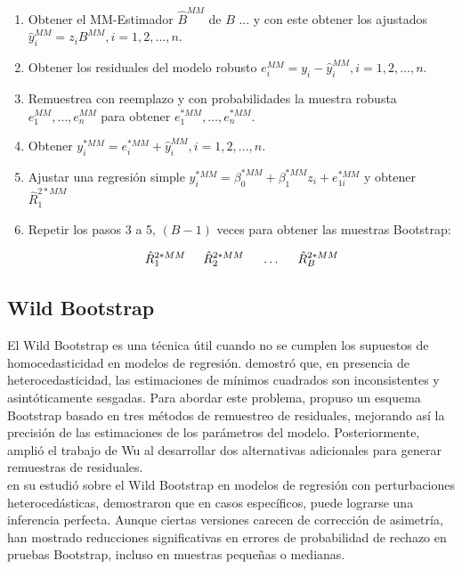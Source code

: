 \begin{enumerate}
	\item Obtener el MM-Estimador $\hat{B}^{MM}$ de $B$ ... y con este  obtener los ajustados $ \hat{y}^{MM}_{i} = z_{i}B^{MM},i=1,2,..., n$.
	
	\item Obtener los residuales del modelo robusto $ e^{MM}_{i} = y_{i}-\hat{y}^{MM}_{i},i = 1,2, \dots, n$.
	
	\item Remuestrea con reemplazo y con probabilidades la muestra robusta $ e^{MM}_{1},\dots, e^{MM}_{n}$ para obtener $ e^{*MM}_{1},\dots, e^{*MM}_{n}$.
	
	\item Obtener $y^{*MM}_{i} = e^{*MM}_{i} + \hat{y}^{MM}_{i},i=1,2,..., n  $.
	
	\item Ajustar una regresión simple $ y^{*MM}_{i} = \beta_{0}^{*MM}+\beta_{1}^{*MM}z_{i} + e^{*MM}_{1i}$ y obtener $\hat{R}^{2*MM}_{1}$
	
	\item Repetir los pasos 3 a 5, $(B-1)$ veces para obtener las muestras Bootstrap:
	
	\[
	\hat{R}^{2*MM}_{1} \hspace{.5cm} \hat{R}^{2*MM}_{2} \hspace{.5cm} \dots \hspace{.5cm} \hat{R}^{2*MM}_{B}
	\]
\end{enumerate}



\subsection{Wild Bootstrap}
El Wild Bootstrap es una técnica útil cuando no se cumplen los supuestos de homocedasticidad en modelos de regresión. \textcite{wu-1986} demostró que, en presencia de heterocedasticidad, las estimaciones de mínimos cuadrados son inconsistentes y asintóticamente sesgadas. Para abordar este problema, propuso un esquema Bootstrap basado en tres métodos de remuestreo de residuales, mejorando así la precisión de las estimaciones de los parámetros del modelo. Posteriormente, \textcite{liu-1988} amplió el trabajo de Wu al desarrollar dos alternativas adicionales para generar remuestras de residuales. \\


\textcite{russell-2008} en su estudió sobre el Wild Bootstrap en modelos de regresión con perturbaciones heterocedásticas, demostraron que en casos específicos, puede lograrse una inferencia perfecta. Aunque ciertas versiones carecen de corrección de asimetría, han mostrado reducciones significativas en errores de probabilidad de rechazo en pruebas Bootstrap, incluso en muestras pequeñas o medianas.\\

